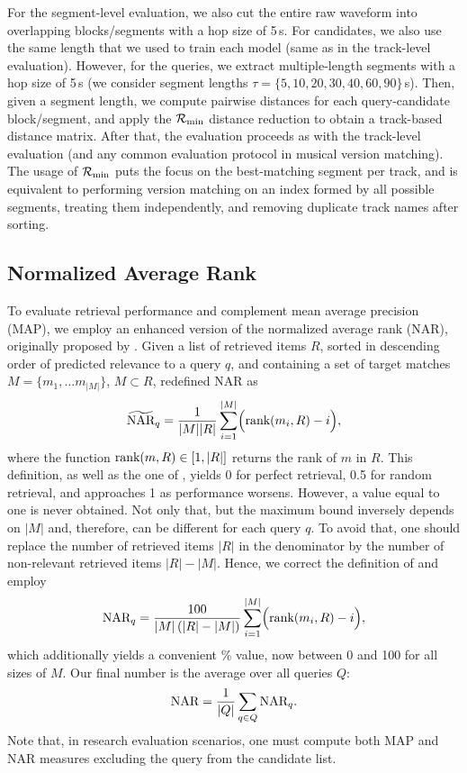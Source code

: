 For the segment-level evaluation, we also cut the entire raw waveform into overlapping blocks/segments with a hop size of 5\,s. For candidates, we also use the same length that we used to train each model (same as in the track-level evaluation). However, for the queries, we extract multiple-length segments with a hop size of 5\,s (we consider segment lengths $\tau=\{5,10,20,30,40,60,90\}$\,s). Then, given a segment length, we compute pairwise distances for each query-candidate block/segment, and apply the $\mathcal{R}_{\text{min}}$ distance reduction to obtain a track-based distance matrix. After that, the evaluation proceeds as with the track-level evaluation (and any common evaluation protocol in musical version matching). The usage of $\mathcal{R}_{\text{min}}$ puts the focus on the best-matching segment per track, and is equivalent to performing version matching on an index formed by all possible segments, treating them independently, and removing duplicate track names after sorting.


\subsection{Normalized Average Rank}

To evaluate retrieval performance and complement mean average precision (MAP), we employ an enhanced version of the normalized average rank (NAR), originally proposed by \citet{muller_performance_2001}. Given a list of retrieved items $R$, sorted in descending order of predicted relevance to a query $q$, and containing a set of target matches $M=\{m_1,\dots m_{|M|}\}$, $M\subset R$, \citet{bosteels_fuzzy_2007} redefined NAR as
\begin{equation*}
\widetilde{\text{NAR}}_q = \frac{1}{|M||R|} \sum_{i=1}^{|M|} \Bigl( \text{rank}(m_i,R)-i \Bigr) ,
\end{equation*}
where the function $\text{rank}(m,R)\in[1,|R|]$ returns the rank of $m$ in $R$. This definition, as well as the one of \citet{muller_performance_2001}, yields 0 for perfect retrieval, 0.5 for random retrieval, and approaches 1 as performance worsens. However, a value equal to one is never obtained. Not only that, but the maximum bound inversely depends on $|M|$ and, therefore, can be different for each query $q$. To avoid that, one should replace the number of retrieved items $|R|$ in the denominator by the number of non-relevant retrieved items $|R|-|M|$. Hence, we correct the definition of \citet{bosteels_fuzzy_2007} and employ
\begin{equation*}
\text{NAR}_q = \frac{100}{|M|\left(|R|-|M|\right)} \sum_{i=1}^{|M|} \Bigl( \text{rank}(m_i,R)-i \Bigr) ,
\end{equation*}
which additionally yields a convenient \% value, now between 0 and 100 for all sizes of $M$. Our final number is the average over all queries $Q$:
\begin{equation*}
\text{NAR} = \frac{1}{|Q|} \sum_{q\in Q} \text{NAR}_q .
\end{equation*}
Note that, in research evaluation scenarios, one must compute both MAP and NAR measures excluding the query from the candidate list.

